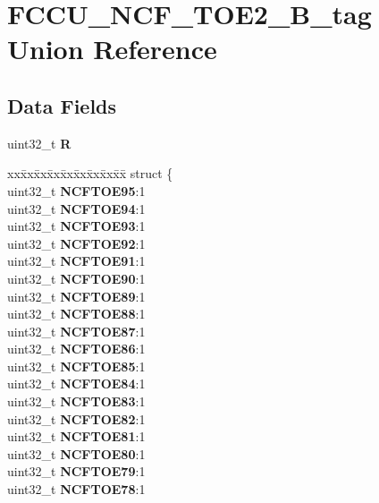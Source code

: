 \hypertarget{unionFCCU__NCF__TOE2__32B__tag}{}\section{F\+C\+C\+U\+\_\+\+N\+C\+F\+\_\+\+T\+O\+E2\+\_\+B\+\_\+tag Union Reference}
\label{unionFCCU__NCF__TOE2__32B__tag}
\subsection*{Data Fields}
\begin{DoxyCompactItemize}
\item 
\mbox{\label{unionFCCU__NCF__TOE2__32B__tag_adc243ab8c8cf5a5028d3c6618b4a2866}} 
uint32\+\_\+t {\bfseries R}
\item 
\mbox{\label{unionFCCU__NCF__TOE2__32B__tag_a5454b402f021ec8d4b1659746ee38007}} 
\begin{tabbing}
xx\=xx\=xx\=xx\=xx\=xx\=xx\=xx\=xx\=\kill
struct \{\\
\>uint32\_t {\bfseries NCFTOE95}:1\\
\>uint32\_t {\bfseries NCFTOE94}:1\\
\>uint32\_t {\bfseries NCFTOE93}:1\\
\>uint32\_t {\bfseries NCFTOE92}:1\\
\>uint32\_t {\bfseries NCFTOE91}:1\\
\>uint32\_t {\bfseries NCFTOE90}:1\\
\>uint32\_t {\bfseries NCFTOE89}:1\\
\>uint32\_t {\bfseries NCFTOE88}:1\\
\>uint32\_t {\bfseries NCFTOE87}:1\\
\>uint32\_t {\bfseries NCFTOE86}:1\\
\>uint32\_t {\bfseries NCFTOE85}:1\\
\>uint32\_t {\bfseries NCFTOE84}:1\\
\>uint32\_t {\bfseries NCFTOE83}:1\\
\>uint32\_t {\bfseries NCFTOE82}:1\\
\>uint32\_t {\bfseries NCFTOE81}:1\\
\>uint32\_t {\bfseries NCFTOE80}:1\\
\>uint32\_t {\bfseries NCFTOE79}:1\\
\>uint32\_t {\bfseries NCFTOE78}:1\\

\end{tabbing}
\end{DoxyCompactItemize}
